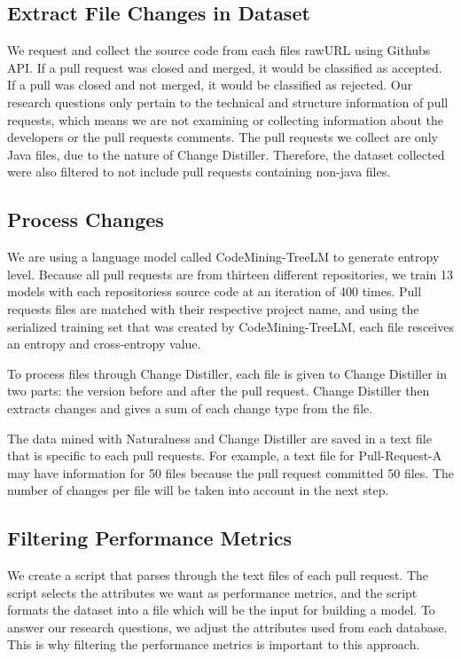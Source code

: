 \documentclass[10pt, conference]{IEEEtran}
\begin{document}
\subsection{Extract File Changes in Dataset}
We request and collect the source code from each file\textquotesingle s rawURL using Github\textquotesingle s API. If a pull request was closed and merged, it would be classified as accepted. If a pull was closed and not merged, it would be classified as rejected. Our research questions only pertain to the technical and structure information of pull requests, which means we are not examining or collecting information about the developers or the pull request\textquotesingle s comments. The pull requests we collect are only Java files, due to the nature of Change Distiller. Therefore, the dataset collected were also filtered to not include pull requests containing non-java files.

\subsection{Process Changes}
We are using a language model called CodeMining-TreeLM to generate entropy level. Because all pull requests are from thirteen different repositories, we train 13 models with each repositories\textquotesingle s source code at an iteration of 400 times. Pull request\textquotesingle s files are matched with their respective project name, and using the serialized training set that was created by CodeMining-TreeLM, each file resceives an entropy and cross-entropy value.

To process files through Change Distiller, each file is given to Change Distiller in two parts: the version before and after the pull request. Change Distiller then extracts changes and gives a sum of each change type from the file. 

The data mined with Naturalness and Change Distiller are saved in a text file that is specific to each pull requests. For example, a text file for Pull-Request-A may have information for 50 files because the pull request committed 50 files. The number of changes per file will be taken into account in the next step.

\subsection{Filtering Performance Metrics}
We create a script that parses through the text files of each pull request. The script selects the attributes we want as performance metrics, and the script formats the dataset into a file which will be the input for building a model. To answer our research questions, we adjust the attributes used from each database. This is why filtering the performance metrics is important to this approach.
\end{document}
